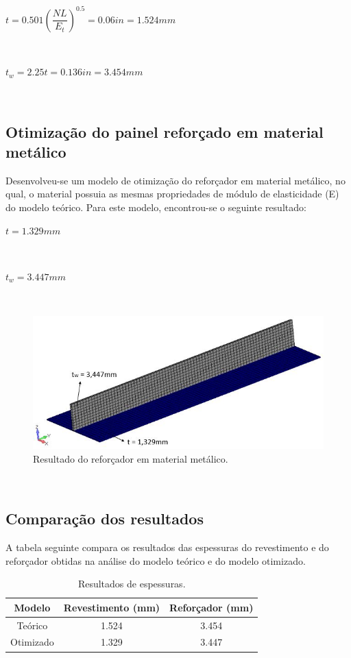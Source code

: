 \centerline{$t = 0.501({\dfrac{NL}{E_t}})^{0.5} = 0.06 in = 1.524 mm$}\

\centerline{$t_w = 2.25t = 0.136in = 3.454 mm$}\


\subsection{Otimização do painel reforçado em material metálico}
Desenvolveu-se um modelo de otimização do reforçador em material metálico, no qual, o material possuia as mesmas propriedades de módulo de elasticidade (E) do modelo teórico. Para este modelo, encontrou-se o seguinte resultado:\

\centerline{$t = 1.329 mm$}\

\centerline{$t_w = 3.447 mm$}\

\begin{figure}[ht]
 \caption{\label{fig_ModelMetallic}Resultado do reforçador em material metálico.}
 \centering
 \includegraphics[scale=1.0]{figura/Model_Metallic1}
\end{figure}
\

\subsection{Comparação dos resultados}
A tabela seguinte compara os resultados das espessuras do revestimento e do reforçador obtidas na análise do modelo teórico e do modelo otimizado.
\begin{table}[h]
\centering
\begin{tabular}{ccc}
\toprule
Modelo & Revestimento (mm) & Reforçador (mm) \\\midrule
Teórico & 1.524 & 3.454\\
Otimizado & 1.329 & 3.447\\
\bottomrule
\end{tabular}
\caption{Resultados de espessuras.}
\label{tbl:result1_metalico}
\end{table}


